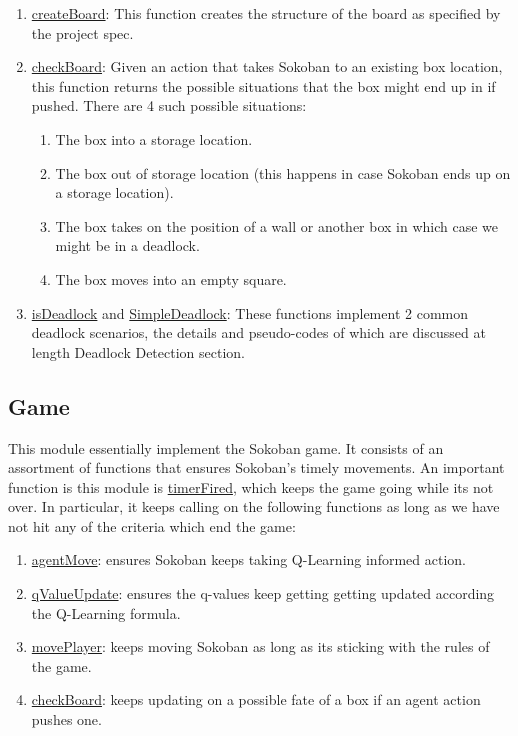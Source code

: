 \documentclass{article}
\begin{document}
\begin{enumerate}[label=\alph*)]
    \item \underline{createBoard}: This function creates the structure of the board as specified by the project spec.  %
    \item \underline{checkBoard}: Given an action that takes Sokoban to an existing box location, this function returns the possible situations that the box might end up in if pushed. There are 4 such possible situations:
    
    \begin{enumerate}[label=\arabic*)]
        \item The box into a storage location. 
        \item The box out of storage location (this happens in case Sokoban ends up on a storage location).
        \item The box takes on the position of a wall or another box in which case we might be in a deadlock.
        \item The box moves into an empty square. 
    \end{enumerate}
    
    \item \underline{isDeadlock} and \underline{SimpleDeadlock}: These functions implement 2 common deadlock scenarios, the details and pseudo-codes of which are discussed at length Deadlock Detection section. 
\end{enumerate}

\subsection{Game}
This module essentially implement the Sokoban game. It consists of an assortment of functions that ensures Sokoban's timely movements. An important function is this module is \underline{timerFired}, which keeps the game going while its not over. In particular, it keeps calling on the following functions as long as we have not hit any of the criteria which end the game: 

\begin{enumerate}[label=\alph*)]
    \item \underline{agentMove}: ensures Sokoban keeps taking Q-Learning informed action.
    \item \underline{qValueUpdate}: ensures the q-values keep getting getting updated according the Q-Learning formula. 
    \item \underline{movePlayer}: keeps moving Sokoban as long as its sticking with the rules of the game.
    \item \underline{checkBoard}: keeps updating on a possible fate of a box if an agent action pushes one.
\end{enumerate}
\end{document}
